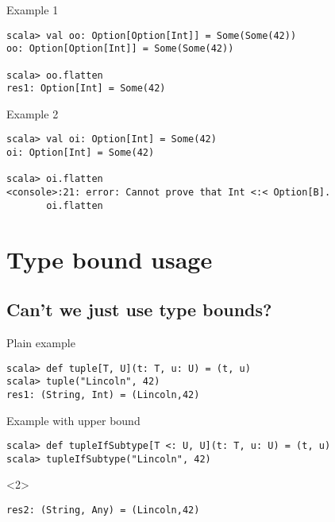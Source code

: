 \documentclass[11pt]{beamer}
\begin{document}
\begin{frame}[fragile]
\begin{block}{Example 1} 
\begin{lstlisting} 
scala> val oo: Option[Option[Int]] = Some(Some(42))
oo: Option[Option[Int]] = Some(Some(42))

scala> oo.flatten
res1: Option[Int] = Some(42)
\end{lstlisting} 
\end{block}

\begin{block}{Example 2}
\begin{lstlisting} 
scala> val oi: Option[Int] = Some(42)
oi: Option[Int] = Some(42)

scala> oi.flatten
<console>:21: error: Cannot prove that Int <:< Option[B].
       oi.flatten
\end{lstlisting} 
\end{block} 
\end{frame}


\section{Type bound usage} 
\subsection{Can’t we just use type bounds?}
\begin{frame}[fragile] {Plain example}
\begin{lstlisting} 
scala> def tuple[T, U](t: T, u: U) = (t, u)
scala> tuple("Lincoln", 42)
res1: (String, Int) = (Lincoln,42)
\end{lstlisting}
\end{frame}

\begin{frame}[fragile] {Example with upper bound}
\begin{lstlisting} 
scala> def tupleIfSubtype[T <: U, U](t: T, u: U) = (t, u)
scala> tupleIfSubtype("Lincoln", 42)
\end{lstlisting} 
\begin{uncoverenv}<2> 
\begin{lstlisting} 
res2: (String, Any) = (Lincoln,42)
\end{lstlisting} 
\end{uncoverenv}
\end{frame}
\end{document}
